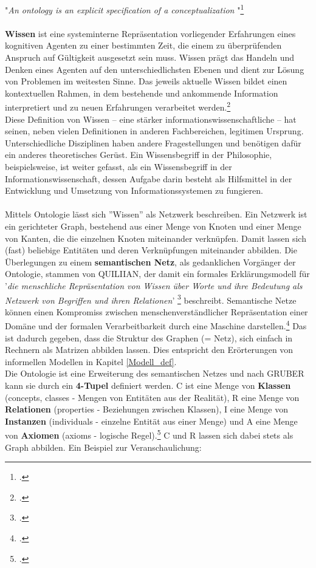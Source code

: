 \documentclass[12pt,a4paper]{article}
\begin{document}
"\textit{An ontology is an explicit specification of a conceptualization}
"\footcite[][S.69]{hoekstra2009ontology}
\\
\\
\textbf{Wissen} ist eine systeminterne Repräsentation vorliegender Erfahrungen eines kognitiven Agenten zu einer bestimmten Zeit, die einem zu überprüfenden Anspruch auf Gültigkeit ausgesetzt sein muss. Wissen prägt das Handeln und Denken eines Agenten auf den unterschiedlichsten Ebenen und dient zur Lösung von Problemen im weitesten Sinne. Das jeweils aktuelle Wissen bildet einen kontextuellen Rahmen, in dem bestehende und ankommende Information interpretiert und zu neuen Erfahrungen verarbeitet werden.\footcite{favre2001information}
\\
Diese Definition von Wissen -- eine stärker informationswissenschaftliche -- hat seinen, neben vielen Definitionen in anderen Fachbereichen, legitimen Ursprung. Unterschiedliche Disziplinen haben andere Fragestellungen und benötigen dafür ein anderes theoretisches Gerüst. Ein Wissensbegriff in der Philosophie, beispielsweise, ist weiter gefasst, als ein Wissensbegriff in der Informationswissenschaft, dessen Aufgabe darin besteht als Hilfsmittel in der Entwicklung und Umsetzung von Informationssystemen zu fungieren. 
\\
\\
Mittels Ontologie lässt sich ''Wissen'' als Netzwerk beschreiben. Ein Netzwerk ist ein gerichteter Graph, bestehend aus einer Menge von Knoten und einer Menge von Kanten, die die einzelnen Knoten miteinander verknüpfen. Damit lassen sich (fast) beliebige Entitäten und deren Verknüpfungen miteinander abbilden. Die Überlegungen zu einem \textbf{semantischen Netz}, als gedanklichen Vorgänger der Ontologie, stammen von QUILIIAN, der damit ein formales Erklärungsmodell für '\textit{die menschliche Repräsentation von Wissen über Worte und ihre Bedeutung als Netzwerk von Begriffen und ihren Relationen}' \footcite{stuckenschmidt2009ontologien} beschreibt. Semantische Netze können einen Kompromiss zwischen menschenverständlicher Repräsentation einer Domäne  und der formalen Verarbeitbarkeit durch eine Maschine darstellen.\footcite{reichenberger2010grundlagen} Das ist dadurch gegeben, dass die Struktur des Graphen (= Netz), sich einfach in Rechnern als Matrizen abbilden lassen. Dies entspricht den Erörterungen von informellen Modellen in Kapitel \ref{Modell_def}.
\\
Die Ontologie ist eine Erweiterung des semantischen Netzes und nach GRUBER kann sie durch ein \textbf{4-Tupel} definiert werden. C ist eine Menge von \textbf{Klassen} (concepts, classes - Mengen von Entitäten aus der Realität), R eine Menge von \textbf{Relationen} (properties - Beziehungen zwischen Klassen), I eine Menge von \textbf{Instanzen} (individuals - einzelne Entität aus einer Menge) und A eine Menge von \textbf{Axiomen} (axioms - logische Regel).\footcite{joostbreukera2009flood} C und R lassen sich dabei stets als Graph abbilden. Ein Beispiel zur Veranschaulichung: 
\end{document}
